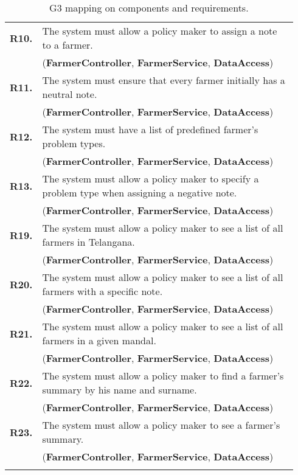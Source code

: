 \begin{longtable}{p{0.06\linewidth} p{0.88\linewidth}}
	\textbf{R10.} & The system must allow a policy maker to assign a note to a farmer.\\
	& (\textbf{FarmerController}, \textbf{FarmerService}, \textbf{DataAccess})\\
	\textbf{R11.} & The system must ensure that every farmer initially has a neutral note.\\	& (\textbf{FarmerController}, \textbf{FarmerService}, \textbf{DataAccess})\\
	\textbf{R12.} & The system must have a list of predefined farmer's problem types.\\
	& (\textbf{FarmerController}, \textbf{FarmerService}, \textbf{DataAccess})\\
    \textbf{R13.} & The system must allow a policy maker to specify a problem type when assigning a negative note.\\
    & (\textbf{FarmerController}, \textbf{FarmerService}, \textbf{DataAccess})\\
	\textbf{R19.} & The system must allow a policy maker to see a list of all farmers in Telangana.\\
	& (\textbf{FarmerController}, \textbf{FarmerService}, \textbf{DataAccess})\\
	\textbf{R20.} & The system must allow a policy maker to see a list of all farmers with a specific note.\\
	& (\textbf{FarmerController}, \textbf{FarmerService}, \textbf{DataAccess})\\
	\textbf{R21.} & The system must allow a policy maker to see a list of all farmers in a given mandal.\\
	& (\textbf{FarmerController}, \textbf{FarmerService}, \textbf{DataAccess})\\
	\textbf{R22.} & The system must allow a policy maker to find a farmer's summary by his name and surname.\\
	& (\textbf{FarmerController}, \textbf{FarmerService}, \textbf{DataAccess})\\
	\textbf{R23.} & The system must allow a policy maker to see a farmer's summary.\\
	& (\textbf{FarmerController}, \textbf{FarmerService}, \textbf{DataAccess})\\
    
    \bottomrule
\caption{G3 mapping on components and requirements.}
\end{longtable}


